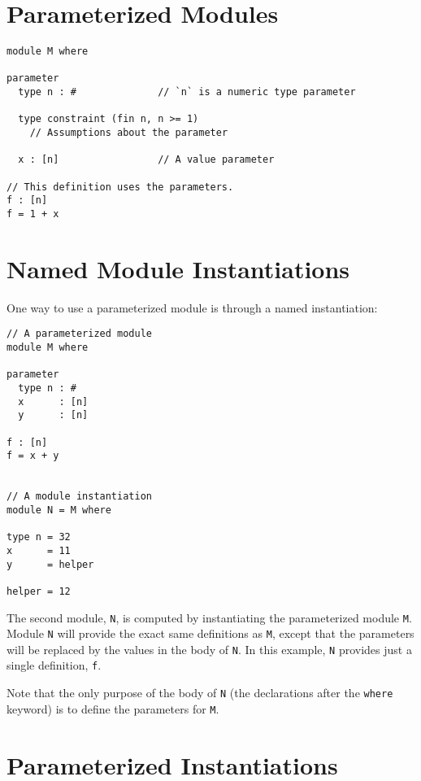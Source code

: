\hypertarget{parameterized-modules}{%
\section{Parameterized Modules}\label{parameterized-modules}}

\begin{verbatim}
module M where

parameter
  type n : #              // `n` is a numeric type parameter

  type constraint (fin n, n >= 1)
    // Assumptions about the parameter

  x : [n]                 // A value parameter

// This definition uses the parameters.
f : [n]
f = 1 + x
\end{verbatim}

\hypertarget{named-module-instantiations}{%
\section{Named Module
Instantiations}\label{named-module-instantiations}}

One way to use a parameterized module is through a named instantiation:

\begin{verbatim}
// A parameterized module
module M where

parameter
  type n : #
  x      : [n]
  y      : [n]

f : [n]
f = x + y


// A module instantiation
module N = M where

type n = 32
x      = 11
y      = helper

helper = 12
\end{verbatim}

The second module, \texttt{N}, is computed by instantiating the
parameterized module \texttt{M}. Module \texttt{N} will provide the
exact same definitions as \texttt{M}, except that the parameters will be
replaced by the values in the body of \texttt{N}. In this example,
\texttt{N} provides just a single definition, \texttt{f}.

Note that the only purpose of the body of \texttt{N} (the declarations
after the \texttt{where} keyword) is to define the parameters for
\texttt{M}.

\hypertarget{parameterized-instantiations}{%
\section{Parameterized
Instantiations}\label{parameterized-instantiations}}

